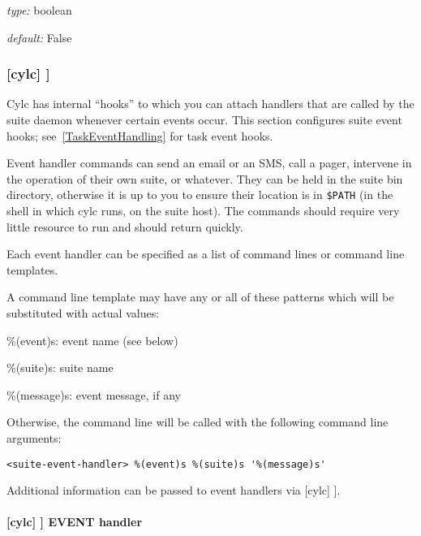 \begin{myitemize}
    \item {\em type:} boolean
    \item {\em default:} False
\end{myitemize}

\subsubsection[{[[}events{]]}]{[cylc] \textrightarrow [[events]]}
\label{SuiteEventHandling}

Cylc has internal ``hooks'' to which you can attach handlers that are
called by the suite daemon whenever certain events occur. This section
configures suite event hooks; see~\ref{TaskEventHandling} for
task event hooks.

Event handler commands can send an email or an SMS, call a pager, intervene in
the operation of their own suite, or whatever.
They can be held in the suite bin directory, otherwise it is up to you
to ensure their location is in \lstinline=$PATH= (in the shell in which
cylc runs, on the suite host). The commands should require
very little resource to run and should return quickly.

Each event handler can be specified as a list of command lines or command
line templates.

A command line template may have any or all of these patterns which will be
substituted with actual values:
\begin{myitemize}
    \item \%(event)s: event name (see below)
    \item \%(suite)s: suite name
    \item \%(message)s: event message, if any
\end{myitemize}

Otherwise, the command line will be called with the following command line
arguments:
\begin{lstlisting}
<suite-event-handler> %(event)s %(suite)s '%(message)s'
\end{lstlisting}

Additional information can be passed to event handlers via
[cylc] \textrightarrow [[environment]].

\paragraph[EVENT handler]{[cylc] \textrightarrow [[events]] \textrightarrow EVENT handler}

